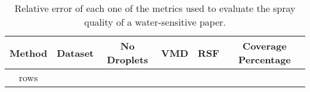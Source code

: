 
\begin{table}[h!]
    \centering
    \caption{Relative error of each one of the metrics used to evaluate the spray quality of a water-sensitive paper.}
    \label{tab:my_label}
    \begin{tabular}{c c c c c c}
        \hline
        \textbf{Method} & \textbf{Dataset} & \textbf{No Droplets} & \textbf{VMD} & \textbf{RSF} &  \textbf{Coverage Percentage }\\
        \hline
        {rows}
        \hline
    \end{tabular}
\end{table}
